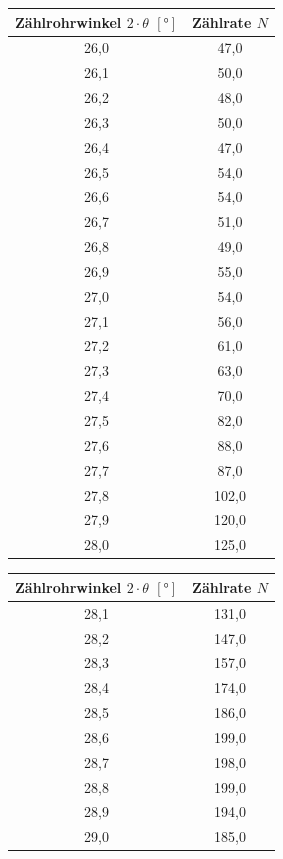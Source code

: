 \begin{table} [H]
    \label{tab:Bragg}
  \begin{minipage}{0.5\textwidth}
    \begin{tabular}{c|c}
      \textbf{Zählrohrwinkel $2 \cdot \theta$ $[°]$} & \textbf{Zählrate $N$}\\
      \hline
      26,0   & 47,0 \\
      26,1   & 50,0 \\
      26,2	 & 48,0 \\
      26,3	 & 50,0 \\
      26,4	 & 47,0 \\
      26,5	 & 54,0 \\
      26,6	 & 54,0 \\
      26,7	 & 51,0 \\
      26,8	 & 49,0 \\
      26,9	 & 55,0 \\
      27,0	 & 54,0 \\
      27,1	 & 56,0 \\
      27,2	 & 61,0 \\
      27,3	 & 63,0 \\
      27,4	 & 70,0 \\
      27,5	 & 82,0 \\
      27,6	 & 88,0 \\
      27,7	 & 87,0 \\
      27,8	 & 102,0 \\
      27,9	 & 120,0 \\
      28,0	 & 125,0
    \end{tabular}
  \end{minipage}
    \hfill
  \begin{minipage}{0.5\textwidth} 
    \begin{tabular}{c|c}
        \textbf{Zählrohrwinkel $2 \cdot \theta$ $[°]$} & \textbf{Zählrate $N$}\\
      \hline
      28,1	 & 131,0 \\
      28,2	 & 147,0 \\
      28,3	 & 157,0 \\
      28,4	 & 174,0 \\
      28,5	 & 186,0 \\
      28,6	 & 199,0 \\
      28,7	 & 198,0 \\
      28,8	 & 199,0 \\
      28,9	 & 194,0 \\
      29,0	 & 185,0 \\

\end{tabular}
\end{minipage}
\end{table}
